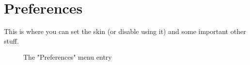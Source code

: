 \documentclass[10pt]{report}
\begin{document}
\section{Preferences}

This is where you can set the skin (or disable using it) and some important other stuff.\newline
\begin{figure}[H]
\centering
{}
\caption{The "Preferences" menu entry}
\end{figure}
\end{document}
